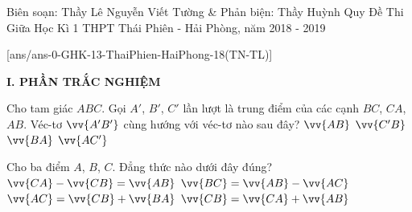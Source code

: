\begin{name}
{Biên soạn: Thầy Lê Nguyễn Viết Tường \& Phản biện: Thầy Huỳnh Quy}
{Đề Thi Giữa Học Kì 1 THPT Thái Phiên - Hải Phòng, năm 2018 - 2019}
\end{name}

\setcounter{ex}{0}\setcounter{bt}{0}
[ans/ans-0-GHK-13-ThaiPhien-HaiPhong-18(TN-TL)]

\noindent\textbf{I. PHẦN TRẮC NGHIỆM}

\begin{ex}%
Cho tam giác $ABC$. Gọi $A'$, $B'$, $C'$ lần lượt là trung điểm của các cạnh $BC$, $CA$, $AB$. Véc-tơ $\vv{A'B'}$ cùng hướng với véc-tơ nào sau đây?
\choice
{$\vv{AB}$}
{$\vv{C'B}$}
{\True $\vv{BA}$}
{$\vv{AC'}$}
\end{ex}
\begin{ex}%
Cho ba điểm $A$, $B$, $C$. Đẳng thức nào dưới đây đúng?
\choice
{$\vv{CA}-\vv{CB}=\vv{AB}$}
{$\vv{BC}=\vv{AB}-\vv{AC}$}
{$\vv{AC}=\vv{CB}+\vv{BA}$}
{\True $\vv{CB}=\vv{CA}+\vv{AB}$}
\end{ex}
